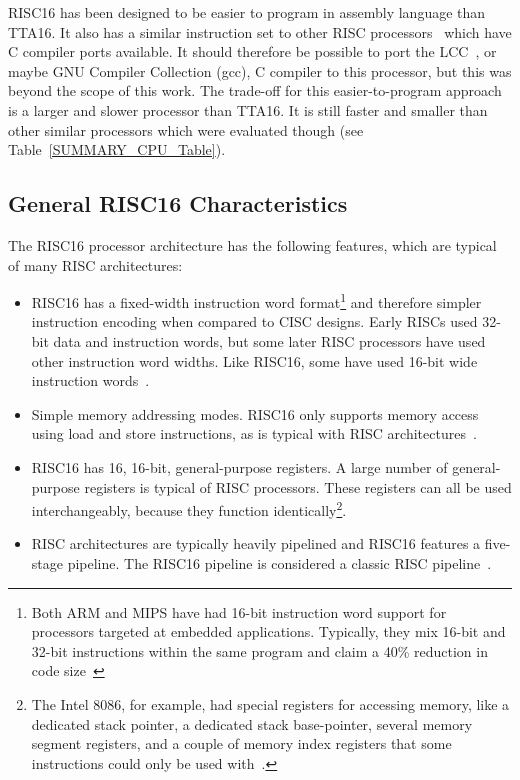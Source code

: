 RISC16 has been designed to be easier to program in assembly language than TTA16.
It also has a similar instruction set to other RISC processors~\cite{FPGACPU,
SuperH} which have C compiler ports available. It should therefore be possible to
port the LCC~\cite{FPGACPU}, or maybe GNU Compiler
Collection (\gls{gcc}), C
compiler to this processor, but this was beyond the scope of this work. The
trade-off for this easier-to-program approach is a larger and slower processor
than TTA16. It is still faster and smaller than other similar processors which
were evaluated though (see Table~\ref{SUMMARY_CPU_Table}).


\subsection{General RISC16 Characteristics}
The RISC16 processor architecture has the following features, which are typical
of many RISC architectures:
\begin{itemize}
  \item RISC16 has a fixed-width instruction word format\footnote{Both ARM and
  MIPS have had 16-bit instruction word support for processors targeted at embedded
  applications. Typically, they mix 16-bit and 32-bit instructions within
  the same program and claim a 40\% reduction in code size~\cite{Comp_Arch}}
  and therefore simpler instruction encoding when compared to CISC designs.
  Early RISCs used 32-bit data and instruction words, but some later RISC
  processors have used other instruction word widths. Like RISC16, some have
  used 16-bit wide instruction words~\cite{FPGACPU, SuperH, ARM_Cortex_M3}.
  \item Simple memory addressing modes. RISC16 only supports memory access
  using load and store instructions, as is typical with RISC
  architectures~\cite{Comp_Arch, Comp_Arch2}.
  \item RISC16 has 16, 16-bit, general-purpose registers. A large number of
  general-purpose registers is typical of RISC processors. These registers can
  all be used interchangeably, because they function identically\footnote{The
  Intel 8086, for example, had special registers for accessing memory, like a
  dedicated stack pointer, a dedicated stack base-pointer, several memory
  segment registers, and a couple of memory index registers that some
  instructions could only be used with~\cite{mcfarland2003md}.}.
  \item RISC architectures are typically heavily pipelined and RISC16
  features a five-stage pipeline. The RISC16 pipeline is considered a classic
  RISC pipeline~\cite{smith1994paa}.
\end{itemize}


